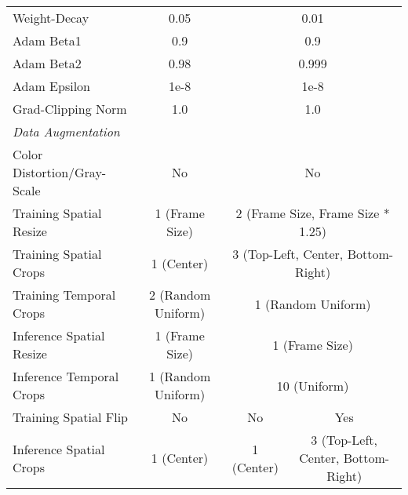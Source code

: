\begin{table}
{\begin{tabular}{@{}lcc|ccccc@{}}
Weight-Decay       & \multicolumn{2}{c|}{0.05}                   & \multicolumn{5}{c}{0.01}                                                        \\
Adam Beta1         & \multicolumn{2}{c|}{0.9}                    & \multicolumn{5}{c}{0.9}                                                         \\
Adam Beta2         & \multicolumn{2}{c|}{0.98}                   & \multicolumn{5}{c}{0.999}                                                       \\
Adam Epsilon       & \multicolumn{2}{c|}{1e-8}                   & \multicolumn{5}{c}{1e-8}                                                        \\
Grad-Clipping Norm & \multicolumn{2}{c|}{1.0}                    & \multicolumn{5}{c}{1.0}                                                         \\ \midrule
\multicolumn{8}{l}{\footnotesize{\textit{Data Augmentation}}} \\
Color Distortion/Gray-Scale
                   & \multicolumn{2}{c|}{No}                     & \multicolumn{5}{c}{No}                                                      \\
Training Spatial Resize      
                   & \multicolumn{2}{c|}{1 (Frame Size)}                     & \multicolumn{5}{c}{2 (Frame Size, Frame Size * 1.25)}                                                      \\
Training Spatial Crops      
                   & \multicolumn{2}{c|}{1 (Center)}                & \multicolumn{5}{c}{3 (Top-Left, Center, Bottom-Right)}                                                      \\
Training Temporal Crops      
                   & \multicolumn{2}{c|}{2 (Random Uniform)}      & \multicolumn{5}{c}{1 (Random Uniform)}                                                      \\
Inference Spatial Resize      
                   & \multicolumn{2}{c|}{1 (Frame Size)}                     & \multicolumn{5}{c}{1 (Frame Size)}                                                      \\
Inference Temporal Crops     
                   & \multicolumn{2}{c|}{1 (Random Uniform)}      & \multicolumn{5}{c}{10 (Uniform)}                                                      \\ 
Training Spatial Flip      
                   & \multicolumn{2}{c|}{No}                    & \multicolumn{1}{c|}{No} & \multicolumn{4}{c}{Yes}                                                      \\
Inference Spatial Crops     
                   & \multicolumn{2}{c|}{1 (Center)}                & \multicolumn{1}{c|}{1 (Center)} & \multicolumn{4}{c}{3 (Top-Left, Center, Bottom-Right)}                                                      \\
\bottomrule
\end{tabular}
}
\label{tab:appen_hyperparam}
\end{table}


